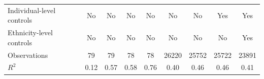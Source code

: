 {\begin{tabular}{l*{8}{c}}
Individual-level controls&       No         &       No         &       No         &       No         &       No         &       No         &      Yes         &      Yes         \\
\addlinespace
Ethnicity-level controls&       No         &       No         &       No         &       No         &       No         &       No         &       No         &      Yes         \\
\midrule
Observations    &       79         &       79         &       78         &       78         &    26220         &    25752         &    25722         &    23891         \\
\(R^{2}\)       &     0.12         &     0.57         &     0.58         &     0.76         &     0.40         &     0.46         &     0.46         &     0.41         \\
\bottomrule
\end{tabular}
}
